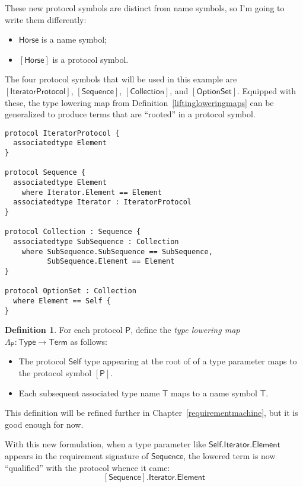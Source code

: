 \documentclass[a4paper,headsepline,bibliography=totoc,toc=flat,fleqn,twoside=semi]{scrbook}
\theoremstyle{definition}
\newtheorem{definition}{Definition}[chapter]
\theoremstyle{definition}
\theoremstyle{definition}
\newcommand{\namesym}[1]{\mathsf{#1}}
\newcommand{\genericparam}[1]{\bm{\mathsf{#1}}}
\newcommand{\proto}[1]{\bm{\mathsf{#1}}}
\newcommand{\protosym}[1]{[\proto{#1}]}
\begin{document}
These new protocol symbols are distinct from name symbols, so I'm going to write them differently:
\begin{itemize}
\item $\namesym{Horse}$ is a name symbol;
\item $\protosym{Horse}$ is a protocol symbol.
\end{itemize}
The four protocol symbols that will be used in this example are $\protosym{IteratorProtocol}$, $\protosym{Sequence}$, $\protosym{Collection}$, and $\protosym{OptionSet}$. Equipped with these, the type lowering map from Definition~\ref{liftingloweringmaps} can be generalized to produce terms that are ``rooted'' in a protocol symbol.

\begin{listing}\label{protocolrewritesystemex}
\begin{Verbatim}
protocol IteratorProtocol {
  associatedtype Element
}

protocol Sequence {
  associatedtype Element
    where Iterator.Element == Element
  associatedtype Iterator : IteratorProtocol
}

protocol Collection : Sequence {
  associatedtype SubSequence : Collection
    where SubSequence.SubSequence == SubSequence,
          SubSequence.Element == Element
}

protocol OptionSet : Collection
  where Element == Self {
}
\end{Verbatim}
\end{listing}

\begin{definition}\label{typelowering1} For each protocol $\proto{P}$, define the \emph{type lowering map} $\Lambda_{\proto{P}}:\mathsf{Type}\rightarrow\mathsf{Term}$ as follows:
\begin{itemize}
\item The protocol $\genericparam{Self}$ type appearing at the root of of a type parameter maps to the protocol symbol $\protosym{P}$.
\item Each subsequent associated type name $\namesym{T}$ maps to a name symbol $\namesym{T}$.
\end{itemize}
This definition will be refined further in Chapter~\ref{requirementmachine}, but it is good enough for now.
\end{definition}
With this new formulation, when a type parameter like $\genericparam{Self}.\namesym{Iterator}.\namesym{Element}$ appears in the requirement signature of $\proto{Sequence}$, the lowered term is now ``qualified'' with the protocol whence it came:
\[\protosym{Sequence}.\namesym{Iterator}.\namesym{Element}\]
\end{document}
